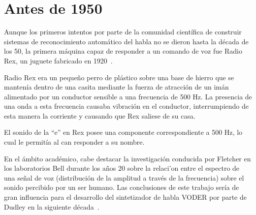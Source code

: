 \section{Antes de 1950}
\label{sec:pre50s}

Aunque los primeros intentos por parte de la comunidad cient\'{i}fica de construir sistemas de reconocimiento autom\'{a}tico del habla no se dieron hasta la d\'{e}cada de los 50, la primera m\'{a}quina capaz de responder
a un comando de voz fue Radio Rex, un juguete fabricado en \mbox{1920 \cite{AnusuyaSpeech2009}}.

Radio Rex era un peque\~{n}o perro de pl\'{a}stico sobre una base de hierro que se manten\'{i}a dentro de una casita
mediante la fuerza de atracci\'{o}n de un im\'{a}n alimentado por un conductor sensible a una frecuencia de 500 Hz.
La presencia de una onda a esta frecuencia causaba vibraci\'{o}n en el conductor, interrumpiendo de
esta manera la corriente y causando que Rex saliese de su casa. 

El sonido de la ``e'' en Rex posee una componente correspondiente a 500 Hz, lo cual le permit\'{i}a al can responder a su nombre.

En el \'{a}mbito acad\'{e}mico, cabe destacar la investigaci\'{o}n conducida por Fletcher en los laboratorios Bell
durante los a\~{n}os 20 sobre la relaci'{o}n entre el espectro de una se\~{n}al de voz (distribuci\'{o}n de 
la amplitud a trav\'{e}s de la frecuencia) sobre el sonido percibido por un ser humano. Las conclusiones de 
este trabajo ser\'{i}a de gran influencia para el desarrollo del sintetizador de habla VODER por parte de 
Dudley en la siguiente \mbox{d\'{e}cada \cite{JuangAutomaticSpeech}}. 